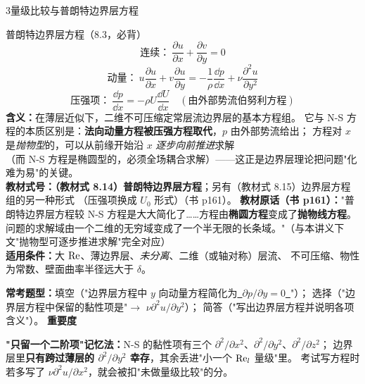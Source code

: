 \begin{kaodian}{3}{量级比较与普朗特边界层方程}
\begin{gongshi}{普朗特边界层方程（8.3，必背）}
\[ \text{连续：}\ \frac{\partial u}{\partial x}+\frac{\partial v}{\partial y}=0 \]
\[ \text{动量：}\ u\frac{\partial u}{\partial x}+v\frac{\partial u}{\partial y}
   =-\frac{1}{\rho}\frac{\dd p}{\dd x}+\nu\frac{\partial^2 u}{\partial y^2} \]
\[ \text{压强项：}\ \frac{\dd p}{\dd x}=-\rho U\frac{\dd U}{\dd x}\quad(\text{由外部势流伯努利方程}) \]
\textbf{含义：}在薄层近似下，二维不可压缩定常层流边界层的基本方程组。
它与 N-S 方程的本质区别是：\textbf{法向动量方程被压强方程取代}，$p$ 由外部势流给出；
方程对 $x$ 是\emph{抛物型}的，可以从前缘开始沿 $x$ \emph{逐步向前推进}求解\\
（而 N-S 方程是椭圆型的，必须全场耦合求解）——这正是边界层理论把问题"化难为易"的关键。\\
\textbf{教材式号：}\textbf{（教材式 8.14）普朗特边界层方程}；另有（教材式 8.15）边界层方程组的另一种形式
（压强项换成 $U_0$ 形式）（书 p161）。
\textbf{教材原话（书 p161）：}"普朗特边界层方程较 N-S 方程是大大简化了……方程由\textbf{椭圆方程}变成了\textbf{抛物线方程}。
问题的求解域由一个二维的无穷域变成了一个半无限的长条域。"（与本讲义下文"抛物型可逐步推进求解"完全对应）\\
\textbf{适用条件：}大 $\mathrm{Re}$、薄边界层、\emph{未分离}、二维（或轴对称）层流、
不可压缩、物性为常数、壁面曲率半径远大于 $\delta$。
\end{gongshi}

\textbf{常考题型：}填空（"边界层方程中 $y$ 向动量方程简化为\underline{\ $\partial p/\partial y=0$\ }"）；
选择（"边界层方程中保留的黏性项是"$\to$ $\nu\partial^2u/\partial y^2$）；
简答（"写出边界层方程并说明各项含义"）。
\textbf{重要度 }\quad{}\quad{}

\begin{banfa}
\textbf{"只留一个二阶项"记忆法：}N-S 的黏性项有三个 $\partial^2/\partial x^2$、$\partial^2/\partial y^2$、$\partial^2/\partial z^2$；
边界层里\textbf{只有跨过薄层的 $\partial^2/\partial y^2$ 幸存}，其余丢进"小一个 $\mathrm{Re}_l$ 量级"里。
考试写方程时若多写了 $\nu\partial^2u/\partial x^2$，就会被扣"未做量级比较"的分。
\end{banfa}
\end{kaodian}

